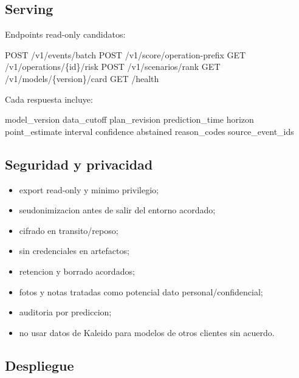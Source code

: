 \documentclass[
  spanish,
  10pt,
  a4paper,
]{article}
\newenvironment{Shaded}{}{}
\newcommand{\NormalTok}[1]{#1}
\providecommand{\tightlist}{%
  \setlength{\itemsep}{0pt}\setlength{\parskip}{0pt}}
\begin{document}
\subsection{Serving}\label{serving}

Endpoints read-only candidatos:

\begin{Shaded}
\begin{Highlighting}[]
\NormalTok{POST /v1/events/batch}
\NormalTok{POST /v1/score/operation{-}prefix}
\NormalTok{GET  /v1/operations/\{id\}/risk}
\NormalTok{POST /v1/scenarios/rank}
\NormalTok{GET  /v1/models/\{version\}/card}
\NormalTok{GET  /health}
\end{Highlighting}
\end{Shaded}

Cada respuesta incluye:

\begin{Shaded}
\begin{Highlighting}[]
\NormalTok{model\_version}
\NormalTok{data\_cutoff}
\NormalTok{plan\_revision}
\NormalTok{prediction\_time}
\NormalTok{horizon}
\NormalTok{point\_estimate}
\NormalTok{interval}
\NormalTok{confidence}
\NormalTok{abstained}
\NormalTok{reason\_codes}
\NormalTok{source\_event\_ids}
\end{Highlighting}
\end{Shaded}

\subsection{Seguridad y privacidad}\label{seguridad-y-privacidad}

\begin{itemize}
\tightlist
\item
  export read-only y minimo privilegio;
\item
  seudonimizacion antes de salir del entorno acordado;
\item
  cifrado en transito/reposo;
\item
  sin credenciales en artefactos;
\item
  retencion y borrado acordados;
\item
  fotos y notas tratadas como potencial dato personal/confidencial;
\item
  auditoria por prediccion;
\item
  no usar datos de Kaleido para modelos de otros clientes sin acuerdo.
\end{itemize}

\subsection{Despliegue}\label{despliegue}
\end{document}

